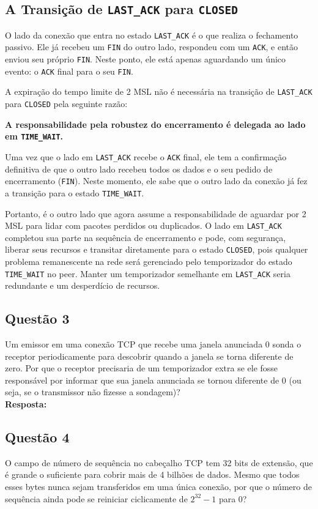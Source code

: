 \subsection*{A Transição de \texttt{LAST\_ACK} para \texttt{CLOSED}}

O lado da conexão que entra no estado \texttt{LAST\_ACK} é o que realiza o fechamento passivo. Ele já recebeu um \texttt{FIN} do outro lado, respondeu com um \texttt{ACK}, e então enviou seu próprio \texttt{FIN}. Neste ponto, ele está apenas aguardando um único evento: o \texttt{ACK} final para o seu \texttt{FIN}.

A expiração do tempo limite de 2 MSL não é necessária na transição de \texttt{LAST\_ACK} para \texttt{CLOSED} pela seguinte razão:

\textbf{A responsabilidade pela robustez do encerramento é delegada ao lado em \texttt{TIME\_WAIT}.}

Uma vez que o lado em \texttt{LAST\_ACK} recebe o \texttt{ACK} final, ele tem a confirmação definitiva de que o outro lado recebeu todos os dados e o seu pedido de encerramento (\texttt{FIN}). Neste momento, ele sabe que o outro lado da conexão já fez a transição para o estado \texttt{TIME\_WAIT}.

Portanto, é o outro lado que agora assume a responsabilidade de aguardar por 2 MSL para lidar com pacotes perdidos ou duplicados. O lado em \texttt{LAST\_ACK} completou sua parte na sequência de encerramento e pode, com segurança, liberar seus recursos e transitar diretamente para o estado \texttt{CLOSED}, pois qualquer problema remanescente na rede será gerenciado pelo temporizador do estado \texttt{TIME\_WAIT} no peer. Manter um temporizador semelhante em \texttt{LAST\_ACK} seria redundante e um desperdício de recursos.



\subsection{Questão 3}
Um emissor em uma conexão TCP que recebe uma janela anunciada 0 sonda o receptor
periodicamente para descobrir quando a janela se torna diferente de zero. Por que o receptor
precisaria de um temporizador extra se ele fosse responsável por informar que sua janela
anunciada se tornou diferente de 0 (ou seja, se o transmissor não fizesse a sondagem)?\\

\noindent
\textbf{Resposta:}

\subsection{Questão 4}
O campo de número de sequência no cabeçalho TCP tem 32 bits de extensão, que é grande o
suficiente para cobrir mais de 4 bilhões de dados. Mesmo que todos esses bytes nunca sejam
transferidos em uma única conexão, por que o número de sequência ainda pode se reiniciar
ciclicamente de $2^{32}-1$ para 0?\\

